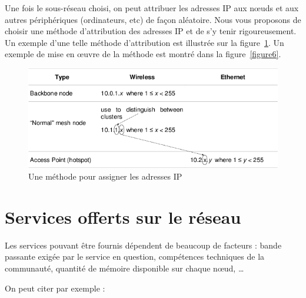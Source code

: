 \documentclass[a4paper,french,11pt,twoside]{article}
\begin{document}
Une fois le sous-réseau choisi, on peut attribuer les adresses IP aux nœuds et aux autres périphériques (ordinateurs, etc) de façon aléatoire. Nous vous proposons de choisir une méthode d'attribution des adresses IP et de s'y tenir rigoureusement. Un exemple d'une telle méthode d'attribution est illustrée sur la figure~\ref{figure5}. Un exemple de mise en œuvre de la méthode est montré dans la figure~\ref{figure6}.

\begin{figure}[!h]
\center
\includegraphics[scale=0.60]{figure5.jpg}
\caption{Une méthode pour assigner les adresses IP} %
\label{figure5}
\end{figure}

\section{Services offerts sur le réseau}

Les services pouvant être fournis dépendent de beaucoup de facteurs : bande passante exigée par le service en question, compétences techniques de la communauté, quantité de mémoire disponible sur chaque nœud, …

\medskip
\noindent On peut citer par exemple :
\end{document}
